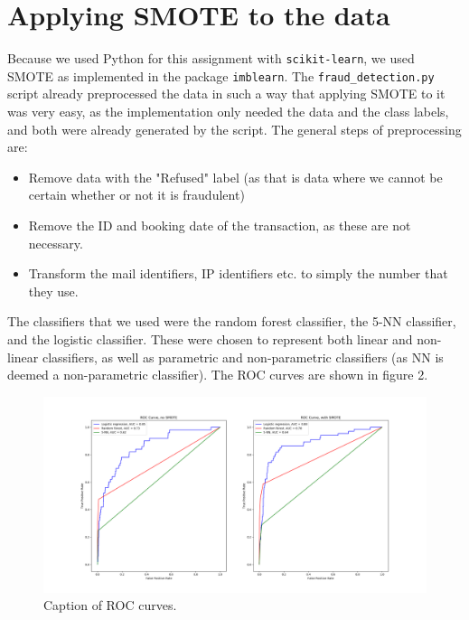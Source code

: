 \documentclass[]{article}
\begin{document}
\section{Applying SMOTE to the data}
Because we used Python for this assignment with \texttt{scikit-learn}, we used SMOTE as implemented in the package \texttt{imblearn}. The \texttt{fraud\_detection.py} script already preprocessed the data in such a way that applying SMOTE to it was very easy, as the implementation only needed the data and the class labels, and both were already generated by the script. The general steps of preprocessing are: 
\begin{itemize}
	\item Remove data with the "Refused" label (as that is data where we cannot be certain whether or not it is fraudulent)
	\item Remove the ID and booking date of the transaction, as these are not necessary.
	\item Transform the mail identifiers, IP identifiers etc. to simply the number that they use.
\end{itemize}
The classifiers that we used were the random forest classifier, the 5-NN classifier, and the logistic classifier. These were chosen to represent both linear and non-linear classifiers, as well as parametric and non-parametric classifiers (as NN is deemed a non-parametric classifier). The ROC curves are shown in figure 2.
\begin{figure}[h!]
	\centering
	\includegraphics[scale = 0.25]{Visualizations/ROC_curves}
	\caption{Caption of ROC curves.}
\end{figure}
\clearpage
\end{document}
